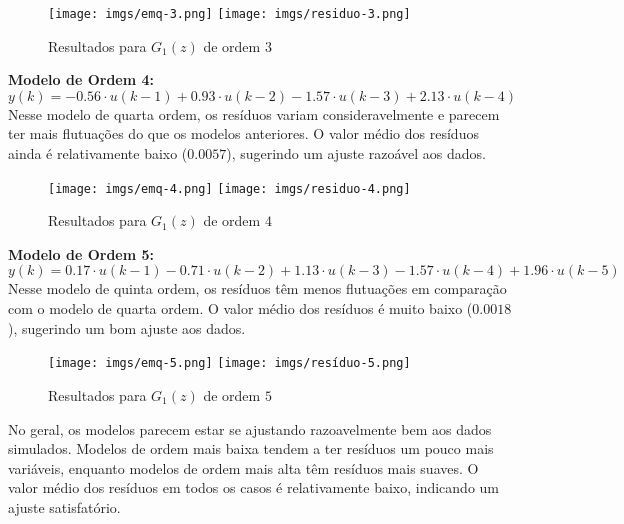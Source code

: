 \documentclass[a4paper,12pt]{article}
\begin{document}
\begin{figure}[h!]
\begin{center}
	\texttt{[image: imgs/emq-3.png]} \quad
	\texttt{[image: imgs/residuo-3.png]}
\caption{Resultados para $G_1(z)$ de ordem $3$} \label{fig8}
\end{center}
\end{figure}

\noindent \textbf{Modelo de Ordem 4:}
\begin{equation*}
   y(k) = -0.56 \cdot u(k-1) + 0.93 \cdot u(k-2) - 1.57 \cdot u(k-3) + 2.13 \cdot u(k-4)\tag{4.4.1.4}
\end{equation*}
Nesse modelo de quarta ordem, os resíduos variam consideravelmente e parecem ter mais flutuações do que os modelos anteriores. O valor médio dos resíduos ainda é relativamente baixo ($0.0057$), sugerindo um ajuste razoável aos dados.

\begin{figure}[h!]
\begin{center}
	\texttt{[image: imgs/emq-4.png]} \quad
	\texttt{[image: imgs/residuo-4.png]}
\caption{Resultados para $G_1(z)$ de ordem $4$} \label{fig9}
\end{center}
\end{figure}

\newpage
\noindent \textbf{Modelo de Ordem 5:}
\begin{equation*}
    y(k) = 0.17 \cdot u(k-1) - 0.71 \cdot u(k-2) + 1.13 \cdot u(k-3) - 1.57 \cdot u(k-4) + 1.96 \cdot u(k-5)\tag{4.4.1.5}
\end{equation*}
Nesse modelo de quinta ordem, os resíduos têm menos flutuações em comparação com o modelo de quarta ordem. O valor médio dos resíduos é muito baixo ($0.0018$), sugerindo um bom ajuste aos dados.

\begin{figure}[h!]
\begin{center}
	\texttt{[image: imgs/emq-5.png]} \quad
	\texttt{[image: imgs/resíduo-5.png]}
\caption{Resultados para $G_1(z)$ de ordem $5$} \label{fig10}
\end{center}
\end{figure}

No geral, os modelos parecem estar se ajustando razoavelmente bem aos dados simulados. Modelos de ordem mais baixa tendem a ter resíduos um pouco mais variáveis, enquanto modelos de ordem mais alta têm resíduos mais suaves. O valor médio dos resíduos em todos os casos é relativamente baixo, indicando um ajuste satisfatório.
\end{document}
